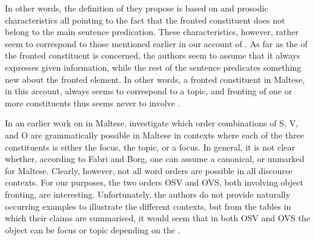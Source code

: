 \documentclass[output=paper]{LSP/langsci}
\begin{document}
In other words, the definition of  they propose is based
on  and prosodic characteristics all pointing to the fact
that the fronted constituent does not belong to the main sentence
predication. These characteristics, however, rather seem to correspond
to those mentioned earlier in our account of . As far
as the  of the fronted constituent is concerned, the
authors seem to assume that it always expresses given information,
while the rest of the sentence predicates something new about the
fronted element. In other words, a fronted constituent in Maltese, in
this account, always seems to correspond to a topic, and fronting of
one or more constituents thus seems never to involve .

In an earlier work on  in Maltese, \citet{FabriBorg2002} 
investigate which order combinations of S, V, and O are
grammatically possible in Maltese in contexts where each of the three
constituents is either the focus, the topic, or a 
focus. In general, it is not clear whether, according to Fabri and
Borg, one can assume a canonical, or unmarked  for
Maltese. Clearly, however, not all word orders are possible in all
discourse contexts. For our purposes, the two orders OSV and OVS, both
involving object fronting, are interesting. Unfortunately, the authors
do not provide naturally occurring examples to illustrate the
different contexts, but from the tables in which their claims are
summarised, it would seem that in both OSV and OVS the object can be
focus or topic depending on the .
\end{document}
